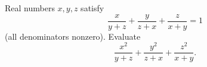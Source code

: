 Real numbers $x,y,z$ satisfy
\[
\dfrac{x}{y+z}+\dfrac{y}{z+x}+\dfrac{z}{x+y}=1
\]
(all denominators nonzero). Evaluate
\[
\dfrac{x^2}{y+z}+\dfrac{y^2}{z+x}+\dfrac{z^2}{x+y}.
\]

